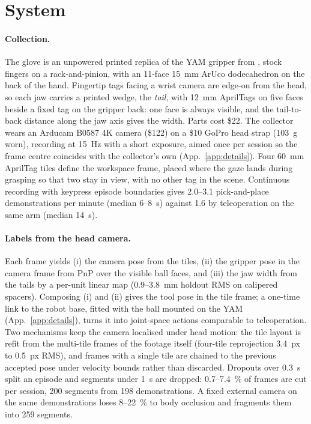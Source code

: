 \section{System}
\label{sec:system}

\paragraph{Collection.}
The glove is an unpowered printed replica of the YAM gripper \citep{i2rtyam} from \citet{yamumi2026}, stock fingers on a rack-and-pinion, with an 11-face \SI{15}{mm} ArUco dodecahedron \citep{garrido2014aruco,wu2017dodecapen} on the back of the hand. Fingertip tags facing a wrist camera \citep{chi2024umi} are edge-on from the head, so each jaw carries a printed wedge, the \emph{tail}, with \SI{12}{mm} AprilTags on five faces beside a fixed tag on the gripper back: one face is always visible, and the tail-to-back distance along the jaw axis gives the width. Parts cost \$22. The collector wears an Arducam B0587 4K camera (\$122) on a \$10 GoPro head strap (\SI{103}{g} worn), recording at \SI{15}{Hz} with a short exposure, aimed once per session so the frame centre coincides with the collector's own (App.~\ref{app:details}). Four \SI{60}{mm} AprilTag tiles define the workspace frame, placed where the gaze lands during grasping so that two stay in view, with no other tag in the scene. Continuous recording with keypress episode boundaries gives 2.0--3.1 pick-and-place demonstrations per minute (median \SI{6}{}--\SI{8}{s}) against 1.6 by teleoperation on the same arm (median \SI{14}{s}).

\paragraph{Labels from the head camera.}
\label{sec:labels}
Each frame yields (i) the camera pose from the tiles, (ii) the gripper pose in the camera frame from PnP over the visible ball faces, and (iii) the jaw width from the tails by a per-unit linear map (\SI{0.9}{}--\SI{3.8}{mm} holdout RMS on calipered spacers). Composing (i) and (ii) gives the tool pose in the tile frame; a one-time link to the robot base, fitted with the ball mounted on the YAM (App.~\ref{app:details}), turns it into joint-space actions comparable to teleoperation. Two mechanisms keep the camera localised under head motion: the tile layout is refit from the multi-tile frames of the footage itself (four-tile reprojection \SI{3.4}{px} to \SI{0.5}{px} RMS), and frames with a single tile are chained to the previous accepted pose under velocity bounds rather than discarded. Dropouts over \SI{0.3}{s} split an episode and segments under \SI{1}{s} are dropped: \SI{0.7}{}--\SI{7.4}{\percent} of frames are cut per session, 200 segments from 198 demonstrations. A fixed external camera on the same demonstrations loses \SI{8}{}--\SI{22}{\percent} to body occlusion and fragments them into 259 segments.

